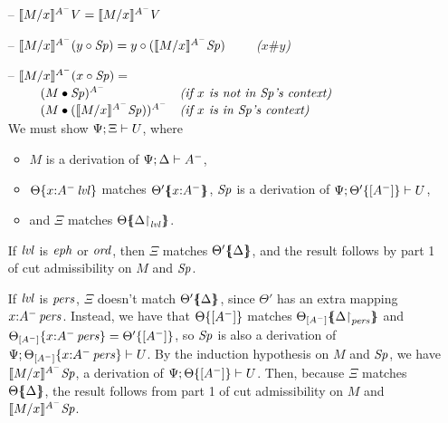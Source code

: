 \begin{itemize}
\item[--] $\rsubsta{M}{x}{\tfocusr{V}}{A^-} 
           = \tfocusr{\rsubsta{M}{x}{V}{A^-}}$
\item[--] $\rsubsta{M}{x}{(\tfocusl{y}{\Sp})}{A^-} 
           = \tfocusl{y}{(\rsubsta{M}{x}{\Sp}{A^-})} \qquad$ {\it ($x \# y$)}
\item[--] $\rsubsta{M}{x}{(\tfocusl{x}{\Sp})}{A^-} =$\\
    $\begin{array}{ll}
    \qquad (\subst{M}{\Sp})^{A^-}
     & \mbox{\it (if $x$ is not in $\Sp$'s context)}\\
    \qquad (\subst{M}{(\rsubsta{M}{x}{\Sp}{A^-})})^{A^-}
     & \mbox{\it (if $x$ is in $\Sp$'s context)}
    \end{array}$\smallskip\\
  We must show $\foc{\Psi}{\Xi}{U}$, where
  \begin{itemize}
  \item $M$ is a derivation of $\foc{\Psi}{\Delta}{A^-}$, 
  \item $\tackon{\Theta}{x{:}\islvl{A^-}}$ matches
     $\frameoff{\Theta'}{x{:}A^-}$, 
     $\Sp$ is a derivation of 
     $\foc{\Psi}{\tackon{\Theta'}{[A^-]}}{U}$,
  \item and $\Xi$ matches $\frameoff{\Theta}{\restrictto{\Delta}{\mlvl}}$.
  \end{itemize}
  If $\mlvl$ is $\meph$ or $\mtrue$, then 
  $\Xi$ matches $\frameoff{\Theta'}{\Delta}$, and the result follows by
  part 1 of cut admissibility on $M$ and $\Sp$. 

  If $\mlvl$ is $\mpers$, $\Xi$ doesn't match $\frameoff{\Theta'}{\Delta}$,
  since $\Theta'$ has an extra mapping $x{:}\ispers{A^-}$. Instead,
  we have that 
    $\tackon{\Theta}{[A^-]}$ matches 
   $\frameoff{\Theta_{[A^-]}}{\restrictto{\Delta}{\mpers}}$
  and $\tackon{\Theta_{[A^-]}}{x{:}\ispers{A^-}} = \tackon{\Theta'}{[A^-]}$,
  so $\Sp$ is also a derivation of 
  $\foc{\Psi}{\tackon{\Theta_{[A^-]}}{x{:}\ispers{A^-}}}{U}$. 
  By the induction hypothesis on $M$ and $\Sp$, we have 
  $\rsubsta{M}{x}{\Sp}{A^-}$, a derivation of 
  $\foc{\Psi}{\tackon{\Theta}{[A^-]}}{U}$. Then, because
  $\Xi$ matches $\frameoff{\Theta}{\Delta}$, the result follows
  from part 1 of cut admissibility on $M$ and $\rsubsta{M}{x}{\Sp}{A^-}$.
  
 


\end{itemize}
